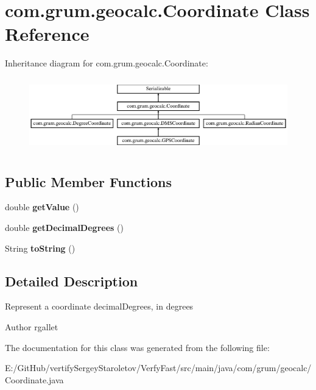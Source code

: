 \hypertarget{classcom_1_1grum_1_1geocalc_1_1_coordinate}{}\section{com.\+grum.\+geocalc.\+Coordinate Class Reference}
\label{classcom_1_1grum_1_1geocalc_1_1_coordinate}
Inheritance diagram for com.\+grum.\+geocalc.\+Coordinate\+:\begin{figure}[H]
\begin{center}
\leavevmode
\includegraphics[height=3.218391cm]{classcom_1_1grum_1_1geocalc_1_1_coordinate}
\end{center}
\end{figure}
\subsection*{Public Member Functions}
\begin{DoxyCompactItemize}
\item 
\mbox{\label{classcom_1_1grum_1_1geocalc_1_1_coordinate_a537604719e4577f8602a78d85e6a0def}} 
double {\bfseries get\+Value} ()
\item 
\mbox{\label{classcom_1_1grum_1_1geocalc_1_1_coordinate_a554c1cace35f4a80aa96576ca5c4e878}} 
double {\bfseries get\+Decimal\+Degrees} ()
\item 
\mbox{\label{classcom_1_1grum_1_1geocalc_1_1_coordinate_af1ac98aac8d58cb82184b4cd830d24f5}} 
String {\bfseries to\+String} ()
\end{DoxyCompactItemize}


\subsection{Detailed Description}
Represent a coordinate decimal\+Degrees, in degrees

\begin{DoxyAuthor}{Author}
rgallet 
\end{DoxyAuthor}


The documentation for this class was generated from the following file\+:\begin{DoxyCompactItemize}
\item 
E\+:/\+Git\+Hub/vertify\+Sergey\+Staroletov/\+Verfy\+Fast/src/main/java/com/grum/geocalc/Coordinate.\+java\end{DoxyCompactItemize}

